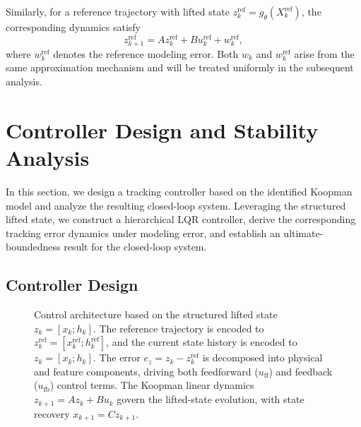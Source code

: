 \documentclass[journal]{IEEEtran}
\begin{document}
Similarly, for a reference trajectory with lifted state $z_k^{\mathrm{ref}} = g_\theta(X_k^{\mathrm{ref}})$, the corresponding dynamics satisfy
\begin{equation}
    z_{k+1}^{\mathrm{ref}} = A z_k^{\mathrm{ref}} + B u_k^{\mathrm{ref}} + w_k^{\mathrm{ref}},
    \label{eq:ref_error}
\end{equation}
where $w_k^{\mathrm{ref}}$ denotes the reference modeling error. Both $w_k$ and $w_k^{\mathrm{ref}}$ arise from the same approximation mechanism and will be treated uniformly in the subsequent analysis.

\section{Controller Design and Stability Analysis}
\label{sec:control}

In this section, we design a tracking controller based on the identified Koopman model and analyze the resulting closed-loop system. Leveraging the structured lifted state, we construct a hierarchical LQR controller, derive the corresponding tracking error dynamics under modeling error, and establish an ultimate-boundedness result for the closed-loop system.

\subsection{Controller Design}
\label{subsec:controller_design}

\begin{figure}[!t]
    \centering
    \caption{Control architecture based on the structured lifted state $z_k=[x_k;h_k]$. The reference trajectory is encoded to $z_k^{\mathrm{ref}}=[x_k^{\mathrm{ref}};h_k^{\mathrm{ref}}]$, and the current state history is encoded to $z_k=[x_k;h_k]$. The error $e_z = z_k - z_k^{\mathrm{ref}}$ is decomposed into physical and feature components, driving both feedforward ($u_{\mathrm{ff}}$) and feedback ($u_{\mathrm{fb}}$) control terms. The Koopman linear dynamics $z_{k+1}=Az_k+Bu_k$ govern the lifted-state evolution, with state recovery $x_{k+1}=Cz_{k+1}$.}
    \label{fig:control_architecture}
\end{figure}
\end{document}
